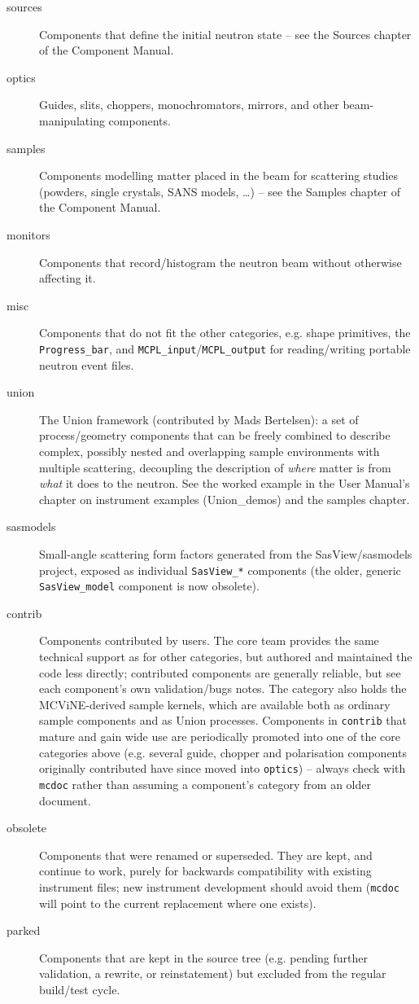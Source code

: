 \begin{description}
\item[sources] Components that define the initial neutron state -- see
  the Sources chapter of the Component Manual.
\item[optics] Guides, slits, choppers, monochromators, mirrors, and other
  beam-manipulating components.
\item[samples] Components modelling matter placed in the beam for
  scattering studies (powders, single crystals, SANS models, \ldots) -- see
  the Samples chapter of the Component Manual.
\item[monitors] Components that record/histogram the neutron beam without
  otherwise affecting it.
\item[misc] Components that do not fit the other categories, e.g. shape
  primitives, the \texttt{Progress\_bar}, and \texttt{MCPL\_input}/\texttt{MCPL\_output}
  for reading/writing portable neutron event files.
\item[union] The Union framework (contributed by Mads Bertelsen): a set of
  process/geometry components that can be freely combined to describe
  complex, possibly nested and overlapping sample environments with
  multiple scattering, decoupling the description of \emph{where} matter is
  from \emph{what} it does to the neutron. See the worked example in
  the User Manual's chapter on instrument examples (Union\_demos) and the
  samples chapter.
\item[sasmodels] Small-angle scattering form factors generated from the
  SasView/sasmodels project, exposed as individual \texttt{SasView\_*}
  components (the older, generic \texttt{SasView\_model} component is now
  obsolete).
\item[contrib] Components contributed by \MCS users. The \MCS core team
  provides the same technical support as for other categories, but authored
  and maintained the code less directly; contributed components are
  generally reliable, but see each component's own validation/bugs notes.
  The category also holds the MCViNE-derived sample kernels, which are
  available both as ordinary sample components and as Union processes.
  Components in \texttt{contrib} that mature and gain wide use are
  periodically promoted into one of the core categories above (e.g. several
  guide, chopper and polarisation components originally contributed have
  since moved into \texttt{optics}) -- always check with \verb+mcdoc+ rather
  than assuming a component's category from an older document.
\item[obsolete] Components that were renamed or superseded. They are kept,
  and continue to work, purely for backwards compatibility with existing
  instrument files; new instrument development should avoid them (\verb+mcdoc+
  will point to the current replacement where one exists).
\item[parked] Components that are kept in the source tree (e.g. pending
  further validation, a rewrite, or reinstatement) but excluded from the
  regular build/test cycle.
\end{description}

